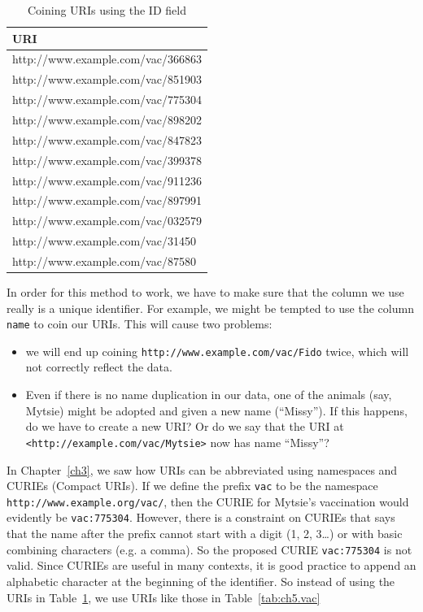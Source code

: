 \begin{table}
    \centering
    \begin{tabular}{|l |}
    \hline
    URI \\
    \hline\hline
http://www.example.com/vac/366863 \\
http://www.example.com/vac/851903 \\
http://www.example.com/vac/775304 \\
http://www.example.com/vac/898202 \\
http://www.example.com/vac/847823 \\
http://www.example.com/vac/399378 \\
http://www.example.com/vac/911236 \\
http://www.example.com/vac/897991 \\
http://www.example.com/vac/032579 \\
http://www.example.com/vac/31450 \\
http://www.example.com/vac/87580 \\
\hline
    \end{tabular}
    \caption{Coining URIs using the ID field }
    \label{tab:ch5.id}
\end{table}


In order for this method to work, we have to make sure that the column we use really is a unique  identifier. 
For example, we might be tempted to use the column \texttt{name} to coin our URIs.  
This will cause two problems: 

\begin{itemize}
    \item we will end up coining 
\texttt{http://www.example.com/vac/Fido} twice, which will not correctly reflect the data. 
\item Even if there is no  name duplication in our data, one of the animals (say, Mytsie) might be adopted and given a new name (``Missy'').  If this happens, do we have to create a new URI?   Or do we say that the URI at \texttt{<http://example.com/vac/Mytsie>} now has name ``Missy''?
\end{itemize}

In Chapter~\ref{ch3}, we saw how URIs can be abbreviated using namespaces and CURIEs (Compact URIs). 
If we define the prefix \texttt{vac} to be the namespace
\texttt{http://www.example.org/vac/}, then the CURIE for Mytsie's vaccination would evidently   be
\texttt{vac:775304}.   However, there is a constraint on CURIEs \cite{Bray:08:EML} that says that the name after the 
 prefix cannot start with a digit (1, 2,
3\ldots{}) or with basic combining characters (e.g. a comma).  So the proposed CURIE \texttt{vac:775304} is not valid.  Since CURIEs are useful in many contexts, it is good practice to append an alphabetic character at the beginning of the identifier.  So instead of using the URIs in Table~\ref{tab:ch5.id}, we use URIs like those in Table~\ref{tab:ch5.vac}

